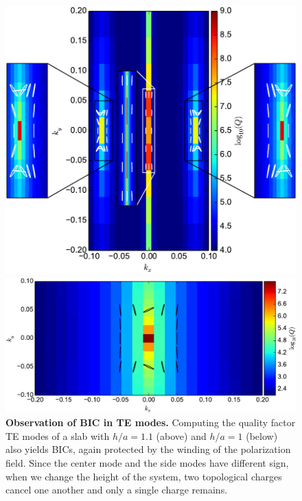 \begin{figure}
\begin{minipage}{0.5\textwidth}
  \centering  
\includegraphics[width=\textwidth]{Figures/h1_1-eps-converted-to-cropped.pdf}
\end{minipage}
\begin{minipage}{0.5\textwidth}
  \centering  
\includegraphics[width=\textwidth]{Figures/h1-eps-converted-to-cropped.pdf}
\end{minipage}
  \caption{{\bf Observation of BIC in TE modes.} Computing the quality factor TE modes of a slab with $h/a = 1.1$ (above) and $h/a=1$ (below) also yields BICs, again protected by the winding of the polarization field. Since the center mode and the side modes have different sign, when we change the height of the system, two topological charges cancel one another and only a single charge remains.}
  \label{fig:TEModes}
\end{figure}

